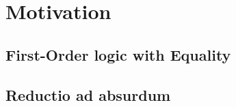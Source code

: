 
\section{Motivation}

\subsection{First-Order logic with Equality}

\begin{frame}
	
\end{frame}

\subsection{Reductio ad absurdum}

\begin{frame}
	
	
\end{frame}

\begin{frame}
	
\end{frame}

\begin{frame}
	
	\pause
	
\end{frame}

\begin{frame}
	
\end{frame}
	

